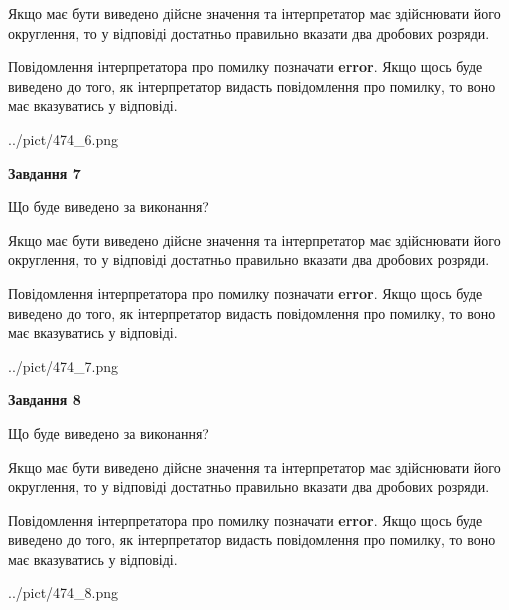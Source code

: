 \documentclass[12pt, ukrainian]{article}
\begin{document}
{\begin {Large}
Якщо має бути виведено дійсне значення та інтерпретатор має здійснювати його округлення, 
то у відповіді достатньо правильно вказати два дробових розряди.

Повідомлення інтерпретатора про помилку позначати \textbf{error}.
Якщо щось буде виведено до того, як інтерпретатор видасть повідомлення про помилку, 
то воно має вказуватись у відповіді. \par

\begin{center}
	{../pict/474_6.png}
\end{center}
\newpage

{\begin {center}\textbf{Завдання 7}\end {center}}\par
Що буде виведено за виконання? \par

Якщо має бути виведено дійсне значення та інтерпретатор має здійснювати його округлення, 
то у відповіді достатньо правильно вказати два дробових розряди.

Повідомлення інтерпретатора про помилку позначати \textbf{error}.
Якщо щось буде виведено до того, як інтерпретатор видасть повідомлення про помилку, 
то воно має вказуватись у відповіді. \par

\begin{center}
	{../pict/474_7.png}
\end{center}
\newpage

{\begin {center}\textbf{Завдання 8}\end {center}}\par
Що буде виведено за виконання? \par

Якщо має бути виведено дійсне значення та інтерпретатор має здійснювати його округлення, 
то у відповіді достатньо правильно вказати два дробових розряди.

Повідомлення інтерпретатора про помилку позначати \textbf{error}.
Якщо щось буде виведено до того, як інтерпретатор видасть повідомлення про помилку, 
то воно має вказуватись у відповіді. \par

\begin{center}
	{../pict/474_8.png}
\end{center}
\newpage


\end{Large}}
\end{document}
